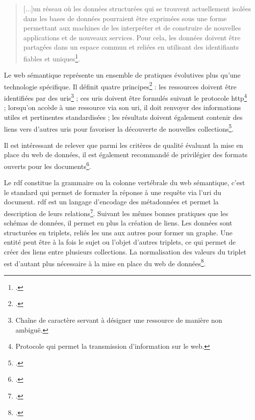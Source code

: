 \begin{quotation}
[...]un réseau où les données structurées qui se trouvent actuellement isolées dans les bases de données pourraient être exprimées sous une forme permettant aux machines de les interpréter et de construire de nouvelles applications et de nouveaux services. Pour cela, les données doivent être partagées dans un espace commun et reliées en utilisant des identifiants fiables et uniques\footcite{bermes_web_2013}.
\end{quotation}

Le web sémantique représente un ensemble de pratiques évolutives plus qu'une technologie spécifique. Il définit quatre principes\footcite{rasmussen_pennington_connecting_2019} : les ressources doivent être identifiées par des \gls{uri}s\footnote{Chaîne de caractère servant à désigner une ressource de manière non ambiguë.} ; ces \gls{uri}s doivent être formulés suivant le protocole \gls{http}\footnote{Protocole qui permet la transmission d'information sur le web.} ; lorsqu'on accède à une ressource via son \gls{uri}, il doit renvoyer des informations utiles et pertinentes standardisées ; les résultats doivent également contenir des liens vers d'autres \gls{uri}s pour favoriser la découverte de nouvelles collections\footcite{zengenene_global_2013}.

Il est intéressant de relever que parmi les critères de qualité évaluant la mise en place du web de données, il est également recommandé de privilégier des formats ouverts pour les documents\footcite{rasmussen_pennington_connecting_2019}.

Le \gls{rdf} constitue la grammaire ou la colonne vertébrale du web sémantique, c'est le standard qui permet de formater la réponse à une requête via l'\gls{uri} du document. \gls{rdf} est un langage d'encodage des métadonnées et permet la description de leurs relations\footcite{zengenene_global_2013}. Suivant les mêmes bonnes pratiques que les schémas de données, il permet en plus la création de liens. Les données sont structurées en triplets, reliés les uns aux autres pour former un graphe. Une entité peut être à la fois le sujet ou l'objet d'autres triplets, ce qui permet de créer des liens entre plusieurs collections. La normalisation des valeurs du triplet est d'autant plus nécessaire à la mise en place du web de données\footcite{pomerantz_metadata_2015}. 


